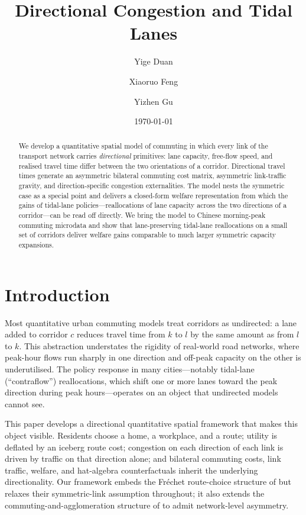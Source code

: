 \documentclass[12pt]{article}
\title{Directional Congestion and Tidal Lanes}
\author{Yige Duan \and Xiaoruo Feng \and Yizhen Gu}
\date{\today}
\begin{document}
\maketitle

\begin{abstract}
\noindent
We develop a quantitative spatial model of commuting in which every
link of the transport network carries \emph{directional} primitives:
lane capacity, free-flow speed, and realised travel time differ
between the two orientations of a corridor.  Directional travel times
generate an asymmetric bilateral commuting cost matrix, asymmetric
link-traffic gravity, and direction-specific congestion externalities.
The model nests the symmetric case as a special point and delivers a
closed-form welfare representation from which the gains of tidal-lane
policies---reallocations of lane capacity across the two directions
of a corridor---can be read off directly.  We bring the model to
Chinese morning-peak commuting microdata and show that lane-preserving
tidal-lane reallocations on a small set of corridors deliver welfare
gains comparable to much larger symmetric capacity expansions.
\end{abstract}

\section{Introduction}\label{sec:intro}

Most quantitative urban commuting models treat corridors as
undirected: a lane added to corridor $c$ reduces travel time from $k$
to $l$ by the same amount as from $l$ to $k$.  This abstraction
understates the rigidity of real-world road networks, where peak-hour
flows run sharply in one direction and off-peak capacity on the other
is underutilised.  The policy response in many cities---notably
tidal-lane (``contraflow'') reallocations, which shift one or more
lanes toward the peak direction during peak hours---operates on an
object that undirected models cannot see.

This paper develops a directional quantitative spatial framework that
makes this object visible.  Residents choose a home, a workplace, and
a route; utility is deflated by an iceberg route cost; congestion on
each direction of each link is driven by traffic on that direction
alone; and bilateral commuting costs, link traffic, welfare, and
hat-algebra counterfactuals inherit the underlying directionality.
Our framework embeds the Fr\'echet route-choice structure of
\citet{AllenArkolakis2022} but relaxes their symmetric-link
assumption throughout; it also extends the commuting-and-agglomeration
structure of \citet{Ahlfeldt2015} to admit network-level asymmetry.
\end{document}
